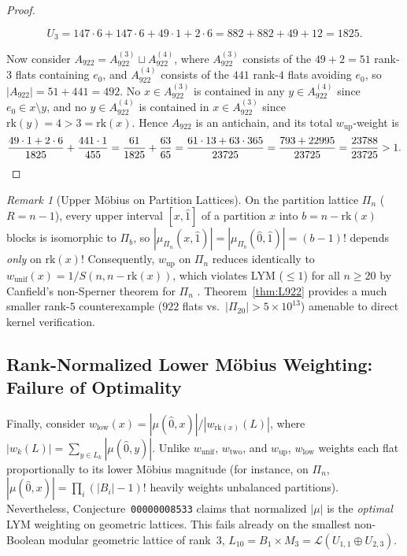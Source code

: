 \documentclass[11pt]{article}
\theoremstyle{definition}
\theoremstyle{remark}
\newtheorem{remark}[theorem]{Remark}
\newcommand{\rk}{\mathrm{rk}}
\begin{document}
\begin{proof}
\begin{enumerate}
\[
  U_3 = 147 \cdot 6 + 147 \cdot 6 + 49 \cdot 1 + 2 \cdot 6 = 882 + 882 + 49 + 12 = 1825.
\]
\end{enumerate}
Now consider $A_{922} = A_{922}^{(3)} \sqcup A_{922}^{(4)}$, where $A_{922}^{(3)}$ consists of the $49 + 2 = 51$ rank-$3$ flats containing $e_0$, and $A_{922}^{(4)}$ consists of the $441$ rank-$4$ flats avoiding $e_0$, so $|A_{922}| = 51 + 441 = 492$. No $x \in A_{922}^{(3)}$ is contained in any $y \in A_{922}^{(4)}$ since $e_0 \in x \setminus y$, and no $y \in A_{922}^{(4)}$ is contained in $x \in A_{922}^{(3)}$ since $\rk(y) = 4 > 3 = \rk(x)$. Hence $A_{922}$ is an antichain, and its total $w_{\mathrm{up}}$-weight is
\[
  \frac{49 \cdot 1 + 2 \cdot 6}{1825} + \frac{441 \cdot 1}{455}
  = \frac{61}{1825} + \frac{63}{65}
  = \frac{61 \cdot 13 + 63 \cdot 365}{23725}
  = \frac{793 + 22995}{23725}
  = \frac{23788}{23725} > 1. \qedhere
\]
\end{proof}

\begin{remark}[Upper M\"obius on Partition Lattices]\label{rem:partition-upper}
On the partition lattice $\Pi_n$ ($R = n - 1$), every upper interval $[x, \hat{1}]$ of a partition $x$ into $b = n - \rk(x)$ blocks is isomorphic to $\Pi_b$, so $|\mu_{\Pi_n}(x, \hat{1})| = |\mu_{\Pi_b}(\hat{0}, \hat{1})| = (b - 1)!$ depends \emph{only} on $\rk(x)$! Consequently, $w_{\mathrm{up}}$ on $\Pi_n$ reduces identically to $w_{\mathrm{unif}}(x) = 1/S(n, n - \rk(x))$, which violates LYM ($\le 1$) for all $n \ge 20$ by Canfield's non-Sperner theorem for $\Pi_n$ \cite{Canfield1978,JichangKleitman1984}. Theorem~\ref{thm:L922} provides a much smaller rank-$5$ counterexample ($922$ flats vs.\ $|\Pi_{20}| > 5 \times 10^{13}$) amenable to direct kernel verification.
\end{remark}

\subsection{Rank-Normalized Lower M\"obius Weighting: Failure of Optimality}

Finally, consider $w_{\mathrm{low}}(x) = |\mu(\hat{0}, x)| / |w_{\rk(x)}(L)|$, where $|w_k(L)| = \sum_{y \in L_k} |\mu(\hat{0}, y)|$. Unlike $w_{\mathrm{unif}}$, $w_{\mathrm{two}}$, and $w_{\mathrm{up}}$, $w_{\mathrm{low}}$ weights each flat proportionally to its lower M\"obius magnitude (for instance, on $\Pi_n$, $|\mu(\hat{0}, x)| = \prod_i (|B_i| - 1)!$ heavily weights unbalanced partitions). Nevertheless, Conjecture~\texttt{00000008533} claims that normalized $|\mu|$ is the \emph{optimal} LYM weighting on geometric lattices. This fails already on the smallest non-Boolean modular geometric lattice of rank~$3$, $L_{10} = B_1 \times M_3 = \mathcal{L}(U_{1,1} \oplus U_{2,3})$.
\end{document}
